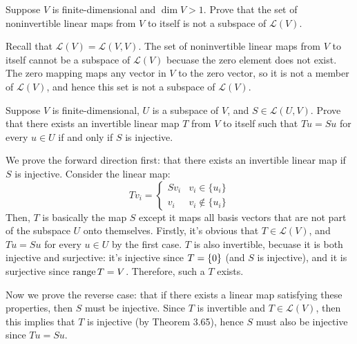 \documentclass[10pt]{article}
\begin{document}
	\begin{problem}
		Suppose \( V \) is finite-dimensional and \( \dim V > 1 \). Prove that the set of noninvertible linear maps 
		from \( V \) to itself is not a subspace of \( \mathcal L(V) \).
	\end{problem}

	\begin{solution}
		Recall that \( \mathcal L(V) = \mathcal L(V, V)\). The set of noninvertible linear maps from \( V \) to 
		itself cannot be a subspace of \( \mathcal L(V) \) becuase the zero element does not exist. The zero 
		mapping maps any vector in \( V \) to the zero vector, so it is not a member of \( \mathcal L(V) \), and 
		hence this set is not a subspace of \( \mathcal L(V) \). 

	\end{solution}

	\begin{problem}
		Suppose \( V \) is finite-dimensional, \( U \) is a subspace of \( V \), and \( S \in \mathcal L(U, V) \).
		Prove that there exists an invertible linear map \( T \) from \( V \) to itself such that \( Tu = Su \) 
		for every \( u \in U \) if and only if \( S \) is injective. 
	\end{problem}

	\begin{solution}
		We prove the forward direction first: that there exists an invertible linear map if \( S \) is 
		injective. Consider the linear map:
		\[
		Tv_i = \begin{cases}
			Sv_i & v_i \in \{u_i\} \\
			v_i & v_i \not \in \{u_i\} 
		\end{cases}
		\]
		Then, \( T \) is basically the map \( S \) except it maps all basis vectors that are not part of the 
		subspace \( U \) onto themselves. Firstly, it's obvious that \( T \in \mathcal L(V)\), and \( Tu = Su \) 
		for every \( u \in U \) by the first case. \( T \) is also invertible, becuase it is both injective
		and surjective: it's injective since \( \null T = \{0\}  \) (and \( S \) is 
		injective), and it is surjective since \( \operatorname*{range} T = V \). Therefore, such a  \( T \) exists. 

		Now we prove the reverse case: that if there exists a linear map satisfying these properties, then
		\( S \) must be injective. Since \( T \) is invertible and  \( T \in \mathcal L(V) \), then this 
		implies that \( T \) is injective (by Theorem 3.65), hence \( S \) must also be 
		injective since \( Tu = Su \). 
	\end{solution}
\end{document}
